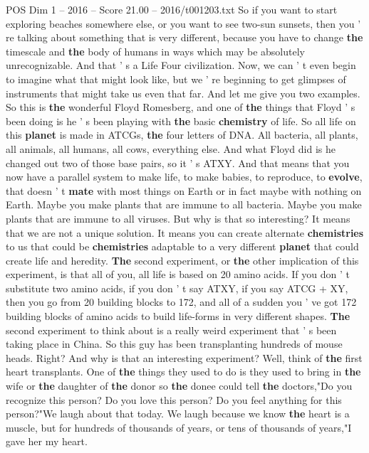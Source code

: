 \begin{textsample}{POS Dim 1 – 2016 – Score 21.00 – 2016/t001203.txt}
So if you want to start exploring beaches somewhere else, or you want to see two-sun sunsets, then you ' re talking about something that is very different, because you have to change \textbf{the} timescale and \textbf{the} body of humans in ways which may be absolutely unrecognizable.
And that ' s a Life Four civilization.
Now, we can ' t even begin to imagine what that might look like, but we ' re beginning to get glimpses of instruments that might take us even that far.
And let me give you two examples.
So this is \textbf{the} wonderful Floyd Romesberg, and one of \textbf{the} things that Floyd ' s been doing is he ' s been playing with \textbf{the} basic \textbf{chemistry} of life.
So all life on this \textbf{planet} is made in ATCGs, \textbf{the} four letters of DNA.
All bacteria, all plants, all animals, all humans, all cows, everything else.
And what Floyd did is he changed out two of those base pairs, so it ' s ATXY.
And that means that you now have a parallel system to make life, to make babies, to reproduce, to \textbf{evolve}, that doesn ' t \textbf{mate} with most things on Earth or in fact maybe with nothing on Earth.
Maybe you make plants that are immune to all bacteria.
Maybe you make plants that are immune to all viruses.
But why is that so interesting?
It means that we are not a unique solution.
It means you can create alternate \textbf{chemistries} to us that could be \textbf{chemistries} adaptable to a very different \textbf{planet} that could create life and heredity. \textbf{The} second experiment, or \textbf{the} other implication of this experiment, is that all of you, all life is based on 20 amino acids.
If you don ' t substitute two amino acids, if you don ' t say ATXY, if you say ATCG + XY, then you go from 20 building blocks to 172, and all of a sudden you ' ve got 172 building blocks of amino acids to build life-forms in very different shapes. \textbf{The} second experiment to think about is a really weird experiment that ' s been taking place in China.
So this guy has been transplanting hundreds of mouse heads.
Right?
And why is that an interesting experiment?
Well, think of \textbf{the} first heart transplants.
One of \textbf{the} things they used to do is they used to bring in \textbf{the} wife or \textbf{the} daughter of \textbf{the} donor so \textbf{the} donee could tell \textbf{the} doctors,"Do you recognize this person?
Do you love this person?
Do you feel anything for this person?"We laugh about that today.
We laugh because we know \textbf{the} heart is a muscle, but for hundreds of thousands of years, or tens of thousands of years,"I gave her my heart.

\end{textsample}
